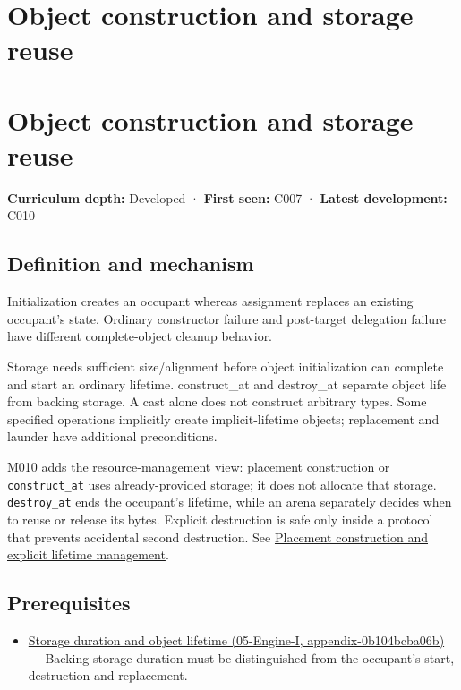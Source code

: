 \hypertarget{appendix-a82f9c438857}{}
\section*{Object construction and storage reuse}
\section{Object construction and storage reuse}\label{object-construction-and-storage-reuse}

\textbf{Curriculum depth:} Developed · \textbf{First seen:} C007 · \textbf{Latest development:} C010

\subsection{Definition and mechanism}\label{definition-and-mechanism}

Initialization creates an occupant whereas assignment replaces an existing occupant's state. Ordinary constructor failure and post-target delegation failure have different complete-object cleanup behavior.

Storage needs sufficient size/alignment before object initialization can complete and start an ordinary lifetime. construct\_at and destroy\_at separate object life from backing storage. A cast alone does not construct arbitrary types. Some specified operations implicitly create implicit-lifetime objects; replacement and launder have additional preconditions.

M010 adds the resource-management view: placement construction or \texttt{construct\_at} uses already-provided storage; it does not allocate that storage. \texttt{destroy\_at} ends the occupant's lifetime, while an arena separately decides when to reuse or release its bytes. Explicit destruction is safe only inside a protocol that prevents accidental second destruction. See \hyperref[appendix-f56c3e43fd4e]{Placement construction and explicit lifetime management}.

\subsection{Prerequisites}\label{prerequisites}

\begin{itemize}
\tightlist
\item
  \href{}{Storage duration and object lifetime (05-Engine-I, appendix-0b104bcba06b)} --- Backing-storage duration must be distinguished from the occupant's start, destruction and replacement.
\end{itemize}

